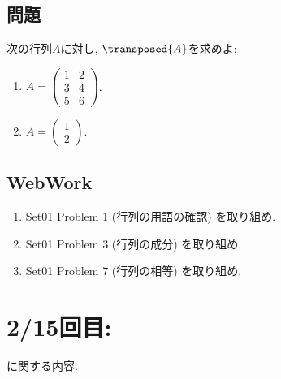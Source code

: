 \subsection{問題}
\begin{quiz}
  次の行列$A$に対し, $\transposed{A}$を求めよ:
  \begin{enumerate}
  \item $A=\begin{pmatrix}
    1&2\\
    3&4\\
    5&6
    \end{pmatrix}$.
  \item $A=\begin{pmatrix}
    1\\
    2
    \end{pmatrix}$.
  \end{enumerate}
\end{quiz}

\subsection{WebWork}
\begin{enumerate}
\item Set01 Problem 1 (行列の用語の確認) を取り組め.
\item Set01 Problem 3 (行列の成分) を取り組め.
\item Set01 Problem 7 (行列の相等) を取り組め.
\end{enumerate}

\newpage
\section{2/15回目: }
に関する内容.
